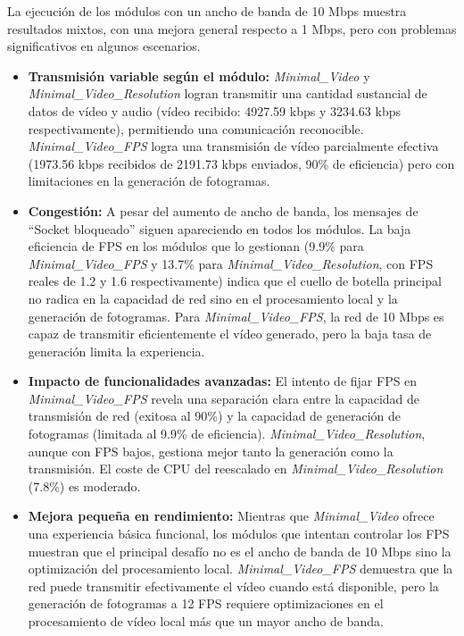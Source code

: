 La ejecución de los módulos con un ancho de banda de 10 Mbps muestra resultados mixtos, con una mejora general respecto a 1 Mbps, pero con problemas significativos en algunos escenarios.
\begin{itemize}
\item \textbf{Transmisión variable según el módulo:} \textit{Minimal\_Video} y \textit{Minimal\_Video\_Resolution} logran transmitir una cantidad sustancial de datos de vídeo y audio (vídeo recibido: 4927.59 kbps y 3234.63 kbps respectivamente), permitiendo una comunicación reconocible. \textit{Minimal\_Video\_FPS} logra una transmisión de vídeo parcialmente efectiva (1973.56 kbps recibidos de 2191.73 kbps enviados, 90\% de eficiencia) pero con limitaciones en la generación de fotogramas.
\item \textbf{Congestión:} A pesar del aumento de ancho de banda, los mensajes de ``Socket bloqueado'' siguen apareciendo en todos los módulos. La baja eficiencia de FPS en los módulos que lo gestionan (9.9\% para \textit{Minimal\_Video\_FPS} y 13.7\% para \textit{Minimal\_Video\_Resolution}, con FPS reales de 1.2 y 1.6 respectivamente) indica que el cuello de botella principal no radica en la capacidad de red sino en el procesamiento local y la generación de fotogramas. Para \textit{Minimal\_Video\_FPS}, la red de 10 Mbps es capaz de transmitir eficientemente el vídeo generado, pero la baja tasa de generación limita la experiencia.
\item \textbf{Impacto de funcionalidades avanzadas:} El intento de fijar FPS en \textit{Minimal\_Video\_FPS} revela una separación clara entre la capacidad de transmisión de red (exitosa al 90\%) y la capacidad de generación de fotogramas (limitada al 9.9\% de eficiencia). \textit{Minimal\_Video\_Resolution}, aunque con FPS bajos, gestiona mejor tanto la generación como la transmisión. El coste de CPU del reescalado en \textit{Minimal\_Video\_Resolution} (7.8\%) es moderado.
\item \textbf{Mejora pequeña en rendimiento:} Mientras que \textit{Minimal\_Video} ofrece una experiencia básica funcional, los módulos que intentan controlar los FPS muestran que el principal desafío no es el ancho de banda de 10 Mbps sino la optimización del procesamiento local. \textit{Minimal\_Video\_FPS} demuestra que la red puede transmitir efectivamente el vídeo cuando está disponible, pero la generación de fotogramas a 12 FPS requiere optimizaciones en el procesamiento de vídeo local más que un mayor ancho de banda.
\end{itemize}

